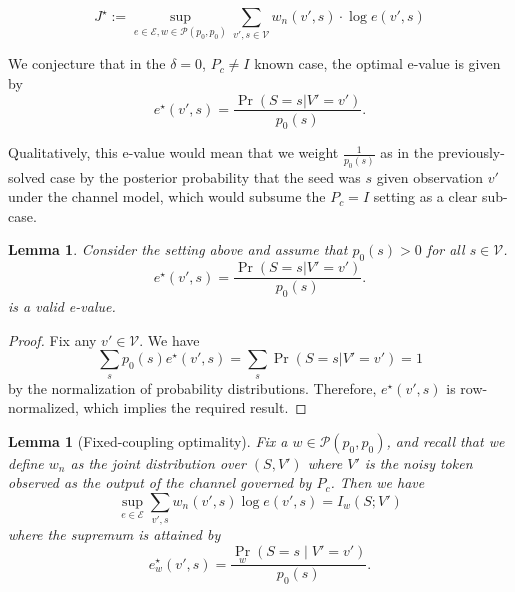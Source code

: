\documentclass[12pt]{article}
\theoremstyle{plain}
\newtheorem{lemma}[theorem]{Lemma}
\theoremstyle{definition}
\begin{document}
\begin{equation}
    J^\star := \sup_{e\in\mathcal{E}, w\in\mathcal{P}(p_0,p_0)}\sum_{v', s\in\mathcal{V}}w_n(v',s)\cdot\log e(v', s)
\end{equation}



We conjecture that in the $\delta=0$, $P_c\neq I$ known case, the optimal e-value is given by
\begin{equation}
    e^\star(v',s)=\frac{\Pr(S=s|V'=v')}{p_0(s)}.
\end{equation}

Qualitatively, this e-value would mean that we weight $\frac{1}{p_0(s)}$ as in the previously-solved case by the posterior probability that the seed was $s$ given observation $v'$ under the channel model, which would subsume the $P_c=I$ setting as a clear sub-case.

\begin{lemma}
\label{lem:del0_Pc_fixed_valid_evalue}
Consider the setting above and assume that $p_0(s)>0$ for all $s\in\mathcal{V}$.
\begin{equation}
    e^\star(v',s)=\frac{\Pr(S=s|V'=v')}{p_0(s)}.
\end{equation}
is a valid e-value.
\end{lemma}
\begin{proof}
Fix any $v'\in\mathcal{V}$. We have
\begin{equation}
    \sum_s p_0(s)e^\star(v',s)=\sum_s \Pr(S=s|V'=v')=1
\end{equation}
by the normalization of probability distributions. Therefore, $e^\star(v',s)$ is row-normalized, which implies the required result.
\end{proof}

\begin{lemma}[Fixed-coupling optimality]
\label{lem:del0_Pc_fixed_coupling_optimality}
Fix a $w\in \mathcal{P}(p_0,p_0)$, and recall that we define $w_n$ as the joint distribution over $(S,V')$ where $V'$ is the noisy token observed as the output of the channel governed by $P_c$. Then we have
\begin{equation}
\sup_{e\in\mathcal{E}}\sum_{v',s}w_n(v',s)\log e(v',s)=I_w(S;V')
\end{equation}
where the supremum is attained by
\begin{equation}
e_w^\star(v',s)
=
\frac{\Pr_w(S=s\mid V'=v')}{p_0(s)}.
\end{equation}
    
\end{lemma}
\end{document}
